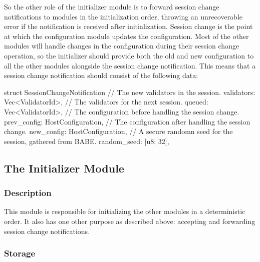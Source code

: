 So the other role of the initializer module is to forward session change
notifications to modules in the initialization order, throwing an unrecoverable
error if the notification is received after initialization. Session change is
the point at which the configuration module updates the configuration. Most of
the other modules will handle changes in the configuration during their session
change operation, so the initializer should provide both the old and new
configuration to all the other modules alongside the session change
notification. This means that a session change notification should consist of
the following data:

\begin{verbnobox}[\small]
struct SessionChangeNotification {
	// The new validators in the session.
	validators: Vec<ValidatorId>,
	// The validators for the next session.
	queued: Vec<ValidatorId>,
	// The configuration before handling the session change.
	prev_config: HostConfiguration,
	// The configuration after handling the session change.
	new_config: HostConfiguration,
	// A secure randomn seed for the session, gathered from BABE.
	random_seed: [u8; 32],
}
\end{verbnobox}

\newline


\subsection{The Initializer Module}

\subsubsection{Description}

This module is responsible for initializing the other modules in a deterministic
order. It also has one other purpose as described above: accepting and
forwarding session change notifications.

\subsubsection{Storage}

